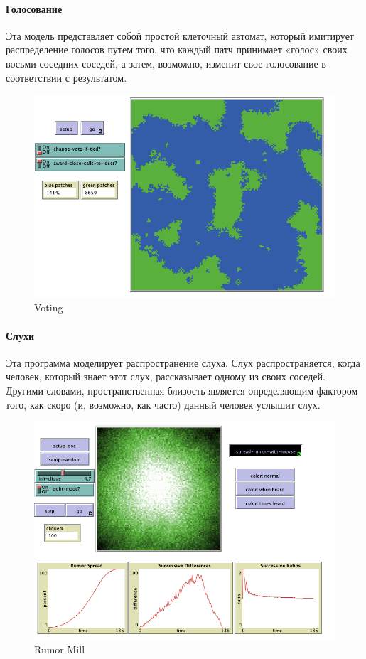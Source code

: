\documentclass[14pt,a4paper,report]{report}
\begin{document}
\paragraph{Голосование}

Эта модель представляет собой простой клеточный автомат, который имитирует распределение голосов путем того, что каждый патч принимает «голос» своих восьми соседних соседей, а затем, возможно, изменит свое голосование в соответствии с результатом.

\begin{figure}[h!]
	\centering
	\includegraphics[scale = 0.49]{images/10.png}
	\caption{Voting}
\end{figure}


\paragraph{Слухи}
Эта программа моделирует распространение слуха. Слух распространяется, когда человек, который знает этот слух, рассказывает одному из своих соседей. Другими словами, пространственная близость является определяющим фактором того, как скоро (и, возможно, как часто) данный человек услышит слух.

\begin{figure}[h!]
	\centering
	\includegraphics[scale = 0.49]{images/11.png}
	\caption{Rumor Mill}
\end{figure}
\end{document}
